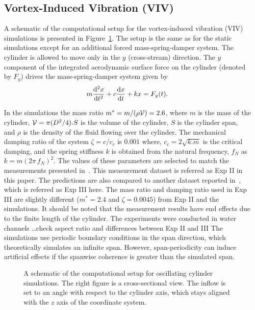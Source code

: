 \subsection{Vortex-Induced Vibration (VIV)}
\label{sec:VIV}
%
A schematic of the computational setup for the vortex-induced vibration (VIV)
simulations is presented in Figure~\ref{fig:VIVmodel}. The setup is the same as
for the static simulations except for an additional forced mass-spring-damper
system. The cylinder is allowed to move only in the $y$ (cross-stream)
direction. The $y$ component of the integrated aerodynamic surface force on the
cylinder (denoted by $F_y$) drives the mass-spring-damper system given by
%
\begin{equation}
  m \frac{{\rm d}^2 x}{{\rm d}t^2} + c \frac{{\rm d} x}{{\rm d}t} + k x = F_y(t).
  \label{eq:mass-spring-damper}
\end{equation}
 
In the simulations the mass ratio $m^*=m/(\rho {\cal V})=2.6$, where $m$ is the
mass of the cylinder, ${\cal V}=\pi (D^2/4) . S$ is the volume of the cylinder,
$S$ is the cylinder span, and $\rho$ is the density of the fluid flowing over
the cylinder. The mechanical damping ratio of the system $\zeta = c/c_c$ is
$0.001$ where, $c_c=2\sqrt{k.m}$ is the critical damping, and the spring
stiffness $k$ is obtained from the natural frequency, $f_N$ as
$k=m(2\pi\,f_N)^2$.  The values of these parameters are selected to match the
measurements presented in~\cite{franzini2013one}.  This measurement dataset is
referred as Exp II in this paper. The predictions are also compared to another
dataset reported in~\cite{khalak1997fluid}, which is referred as Exp III here.
The mass ratio and damping ratio used in Exp III are slightly different
($m^*=2.4$ and $\zeta=0.0045$) from Exp II and the simulations. It should be
noted that the measurement results have end effects due to the finite length of
the cylinder. {\color{red} The experiments were conducted in water channels
\ldots check aspect ratio and differences between Exp II and III} The
simulations use periodic boundary conditions in the span direction, which
theoretically simulates an infinite span. However, span-periodicity can induce
artificial effects if the spanwise coherence is greater than the simulated
span.
%
\begin{figure}[htb!]
  \caption{A schematic of the computational setup for oscillating cylinder
    simulations. The right figure is a cross-sectional view.  The inflow is set
    to an angle with respect to the cylinder axis, which stays aligned with the $z$
    axis of the coordinate system.}
  \label{fig:VIVmodel}
\end{figure}

